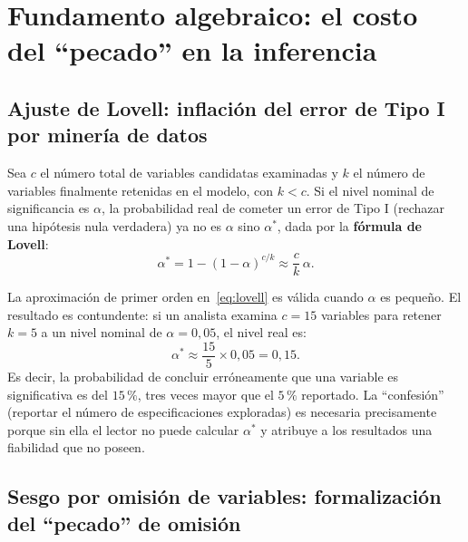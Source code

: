 \documentclass[12pt, letterpaper]{article}
\begin{document}
\section{Fundamento algebraico: el costo del ``pecado'' en la inferencia}

\subsection{Ajuste de Lovell: inflación del error de Tipo I por minería de datos}

Sea $c$ el número total de variables candidatas examinadas y $k$ el número
de variables finalmente retenidas en el modelo, con $k < c$. Si el nivel
nominal de significancia es $\alpha$, la probabilidad real de cometer un
error de Tipo I (rechazar una hipótesis nula verdadera) ya no es $\alpha$
sino $\alpha^*$, dada por la \textbf{fórmula de Lovell}:
\begin{equation}
  \alpha^* = 1 - (1 - \alpha)^{c/k} \approx \frac{c}{k}\,\alpha.
  \label{eq:lovell}
\end{equation}

La aproximación de primer orden en~\eqref{eq:lovell} es válida cuando
$\alpha$ es pequeño. El resultado es contundente: si un analista examina
$c = 15$ variables para retener $k = 5$ a un nivel nominal de $\alpha = 0{,}05$,
el nivel real es:
\[
  \alpha^* \approx \frac{15}{5} \times 0{,}05 = 0{,}15.
\]
Es decir, la probabilidad de concluir erróneamente que una variable es
significativa es del $15\,\%$, tres veces mayor que el $5\,\%$ reportado.
La ``confesión'' (reportar el número de especificaciones exploradas) es
necesaria precisamente porque sin ella el lector no puede calcular $\alpha^*$
y atribuye a los resultados una fiabilidad que no poseen.

\subsection{Sesgo por omisión de variables: formalización del ``pecado'' de omisión}
\end{document}
